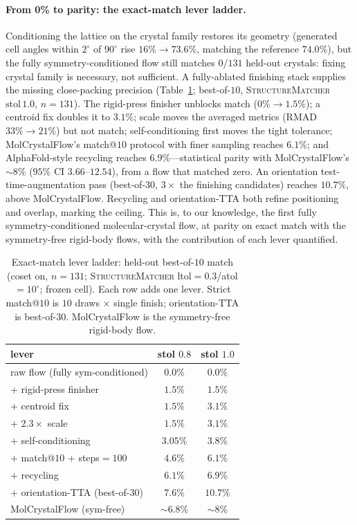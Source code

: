 \documentclass{article}
\begin{document}
\paragraph{From 0\% to parity: the exact-match lever ladder.}
\label{sec:ladder}
Conditioning the lattice on the crystal family restores its geometry (generated
cell angles within $2^\circ$ of $90^\circ$ rise $16\%\!\to\!73.6\%$, matching the
reference $74.0\%$), but the fully symmetry-conditioned flow still matches $0/131$
held-out crystals: fixing crystal family is necessary, not sufficient. A
fully-ablated finishing stack supplies the missing close-packing precision
(Table~\ref{tab:ladder}; best-of-$10$, \textsc{StructureMatcher} $\text{stol}\,1.0$,
$n{=}131$). The rigid-press finisher unblocks match ($0\%\!\to\!1.5\%$); a centroid
fix doubles it to $3.1\%$; scale moves the averaged metrics (RMAD $33\%\!\to\!21\%$)
but not match; self-conditioning first moves the tight tolerance; MolCrystalFlow's
match@$10$ protocol with finer sampling reaches $6.1\%$; and AlphaFold-style
recycling reaches $\mathbf{6.9\%}$---statistical parity with MolCrystalFlow's
$\sim\!8\%$ ($95\%$ CI $3.66$--$12.54$), from a flow that matched zero. An
orientation test-time-augmentation pass (best-of-$30$, $3\times$ the finishing
candidates) reaches $\mathbf{10.7\%}$, above MolCrystalFlow. Recycling and
orientation-TTA both refine positioning and overlap, marking the ceiling. This is,
to our knowledge, the first fully symmetry-conditioned molecular-crystal flow, at
parity on exact match with the symmetry-free rigid-body flows, with the contribution of each lever quantified.

\begin{table}[t]
\centering
\caption{Exact-match lever ladder: held-out best-of-$10$ match (coset on,
$n{=}131$; \textsc{StructureMatcher} ltol$=0.3$/atol$=10^\circ$; frozen cell). Each
row adds one lever. Strict match@$10$ is $10$ draws $\times$ single finish;
orientation-TTA is best-of-$30$. MolCrystalFlow is the symmetry-free rigid-body
flow.}
\label{tab:ladder}
\begin{tabular}{lcc}
\toprule
lever & stol $0.8$ & stol $1.0$ \\
\midrule
raw flow (fully sym-conditioned)       & $0.0\%$ & $0.0\%$ \\
\quad + rigid-press finisher           & $1.5\%$ & $1.5\%$ \\
\quad + centroid fix                   & $1.5\%$ & $3.1\%$ \\
\quad + $2.3\times$ scale              & $1.5\%$ & $3.1\%$ \\
\quad + self-conditioning              & $3.05\%$& $3.8\%$ \\
\quad + match@$10$ + steps$=100$       & $4.6\%$ & $6.1\%$ \\
\quad + recycling                      & $\mathbf{6.1\%}$ & $\mathbf{6.9\%}$ \\
\quad + orientation-TTA (best-of-$30$) & $7.6\%$ & $\mathbf{10.7\%}$ \\
\midrule
MolCrystalFlow (sym-free)\cite{zeng2026molcrystalflow} & $\sim\!6.8\%$ & $\sim\!8\%$ \\
\bottomrule
\end{tabular}
\end{table}
\end{document}
